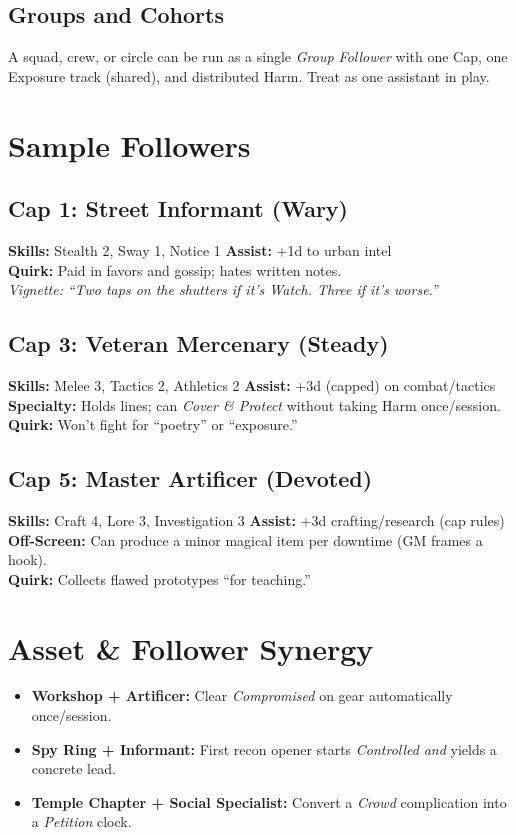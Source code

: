 \begin{multicols}{2}
\subsection*{Groups and Cohorts}
A squad, crew, or circle can be run as a single \emph{Group Follower} with one Cap, one Exposure track (shared), and distributed Harm. Treat as one assistant in play.

\section{Sample Followers}

\subsection*{Cap 1: Street Informant (Wary)}
\textbf{Skills:} Stealth 2, Sway 1, Notice 1 \quad
\textbf{Assist:} +1d to urban intel \\
\textbf{Quirk:} Paid in favors and gossip; hates written notes. \\
\emph{Vignette:} \textit{“Two taps on the shutters if it’s Watch. Three if it’s worse.”}

\subsection*{Cap 3: Veteran Mercenary (Steady)}
\textbf{Skills:} Melee 3, Tactics 2, Athletics 2 \quad
\textbf{Assist:} +3d (capped) on combat/tactics \\
\textbf{Specialty:} Holds lines; can \emph{Cover \& Protect} without taking Harm once/session. \\
\textbf{Quirk:} Won’t fight for “poetry” or “exposure.”

\subsection*{Cap 5: Master Artificer (Devoted)}
\textbf{Skills:} Craft 4, Lore 3, Investigation 3 \quad
\textbf{Assist:} +3d crafting/research (cap rules) \\
\textbf{Off-Screen:} Can produce a minor magical item per downtime (GM frames a hook). \\
\textbf{Quirk:} Collects flawed prototypes “for teaching.”

\section{Asset \& Follower Synergy}
\begin{itemize}
  \item \textbf{Workshop + Artificer:} Clear \emph{Compromised} on gear automatically once/session.
  \item \textbf{Spy Ring + Informant:} First recon opener starts \emph{Controlled} \emph{and} yields a concrete lead.
  \item \textbf{Temple Chapter + Social Specialist:} Convert a \emph{Crowd} complication into a \emph{Petition} clock.
\end{itemize}


\end{multicols}
